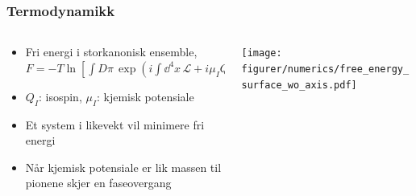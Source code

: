 \documentclass[aspectratio=169]{beamer}
\begin{document}
    \begin{frame}

        \frametitle{Termodynamikk}
        \begin{columns}

            \begin{column}{0.6\textwidth}
                \begin{itemize}
                    \vspace{-1cm}
                    \itemsep 0.8cm
                    \item Fri energi i storkanonisk ensemble,
                    $
                    F = - T
                    \ln[\int D \pi \, 
                    \exp(i \int \dd^4x \, \mathcal L + i \mu_I Q_I )]
                    $
                    \item $Q_I$: isospin, $\mu_I$: kjemisk potensiale
                    \item Et system i likevekt vil minimere fri energi
                    \item Når kjemisk potensiale er lik massen til pionene skjer en faseovergang 
                \end{itemize}
            \end{column}

            \begin{column}{0.5\textwidth}
                \texttt{[image: figurer/numerics/free\_energy\_surface\_wo\_axis.pdf]}
            \end{column}

        \end{columns}

    \end{frame}
\end{document}
